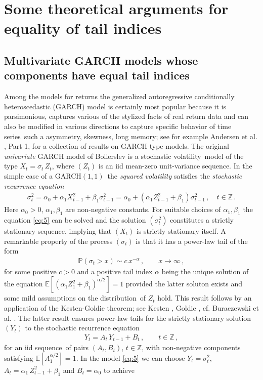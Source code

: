 \documentclass[11pt,a4]{amsart}
\newcommand{\garch}{{\rm GARCH}$(1,1)$}
\newcommand{\ts}{time series}
\newcommand{\sv}{stochastic volatility}
\newcommand{\sre}{stochastic recurrence equation}
\newcommand{\beam}{\begin{eqnarray}}
\newcommand{\eeam}{\end{eqnarray}\noindent}
\newcommand{\xto}{x\to\infty}
\newcommand{\bbz}{{\mathbb Z}}
\newcommand{\ds}{distribution}
\newcommand{\seq}{sequence}
\newcommand{\E }{{\mathbb E}}
\renewcommand{\P }{{\mathbb P}}
\newcommand{\1}{{\mathbf 1}}
\begin{document}
\newpage
\section{Some theoretical arguments for equality of tail indices}\setcounter{equation}{0}\label{sec:2}
\subsection{Multivariate GARCH models whose components have  equal tail indices}\label{subsec:garch}
Among the models for returns the generalized autoregressive conditionally heteroscedastic (GARCH) model
is certainly most popular because it is parsimonious, captures various of the stylized facts of real return data
and can also be modified in various directions to capture specific behavior of \ts\ such a asymmetry, skewness, long memory; 
see for example Andersen et al. \cite{andersen:davis:kreiss:mikosch:2009}, Part 1, for a collection of results
on GARCH-type models.
The original  {\em univariate} GARCH model of Bollerslev \cite{bollerslev:1986} is a \sv\ model of the type $X_t=\sigma_t\,Z_t$, where 
$(Z_t)$ is an iid mean-zero unit-variance \seq . In the simple case of a \garch\ the {\em squared volatility} satisfies the {\em \sre} 
\beam\label{eq:5}
\sigma_t^2= \alpha_0+\alpha_1 X_{t-1}^2+\beta_1\sigma_{t-1}^2=\alpha_0+(\alpha_1Z_{t-1}^2+\beta_1)\sigma_{t-1}^2\,,\quad t\in\bbz\,.
\eeam
Here $\alpha_0>0$, $\alpha_1,\beta_1$ are non-negative constants. For suitable choices of $\alpha_1,\beta_1$ the equation \eqref{eq:5}
can be solved and the solution $(\sigma_t^2)$ constitutes a strictly stationary \seq , implying that $(X_t)$ 
is strictly stationary itself. A remarkable property of the process $(\sigma_t)$ is that it has a power-law tail 
of the form
\beam\label{eq:6}
\P(\sigma_t>x)\sim c\,x^{-\alpha}\,,\qquad \xto\,,
\eeam
for some positive $c>0$ and a positive tail index $\alpha$ being the unique solution of the equation 
$\E [(\alpha_1 Z_1^2+\beta_1)^{\alpha/2}]=1$
provided the latter soluton exists and some mild assumptions on the \ds\ of $Z_t$ hold. This result
follows by an application of the Kesten-Goldie theorem; see Kesten \cite{kesten:1973}, Goldie \cite{goldie:1991}, cf. 
Buraczewski et al. \cite{buraczewski:damek:mikosch:2016}. The latter result ensures power-law tails  for
the strictly stationary  solution $(Y_t)$ to the \sre\ 
\beam\label{eq:7}
Y_t= A_t\,Y_{t-1}+B_t\,,\qquad t\in\bbz\,,
\eeam
for an iid \seq\ of pairs $(A_t,B_t)$, $t\in\bbz$, with non-negative components satisfying $\E [A_1^{\alpha/2}]=1$.  
In the model \eqref{eq:5} we can choose $Y_t=\sigma_t^2$, $A_t=\alpha_1\,Z_{t-1}^2+\beta_1$ and $B_t=\alpha_0$ to achieve
\end{document}
